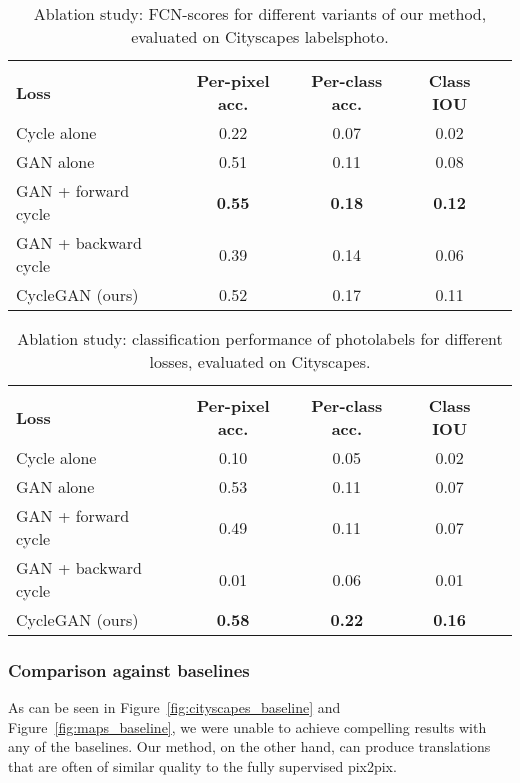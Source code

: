 \documentclass[10pt,twocolumn,letterpaper]{article}
\newcommand{\reffig}[1]{Figure~\ref{fig:#1}}
\newcommand{\lbltbl}[1]{\label{tbl:#1}}
\begin{document}
\begin{table}
\centering
\scalebox{0.75} {
\begin{tabular}{lcccc}
 & & & \\
\textbf{Loss} & \textbf{Per-pixel acc.} & \textbf{Per-class acc.} & \textbf{Class IOU} \\ \hline
Cycle alone & 0.22 & 0.07 & 0.02 \\
GAN alone & 0.51 & 0.11 & 0.08 \\
GAN + forward cycle & {\bf 0.55} & {\bf 0.18} & {\bf 0.12} \\ 
GAN + backward cycle & 0.39 & 0.14 & 0.06 \\ 
CycleGAN (ours) & 0.52 & 0.17 & 0.11 \\  
\end{tabular} }
\vspace{-0.1in}
\caption {Ablation study: FCN-scores for different variants of our method, evaluated on Cityscapes labelsphoto.}
\vspace{-0.2in}
\lbltbl{loss_fcn}
\end{table}



\begin{table}
\centering
\scalebox{0.75} {
\begin{tabular}{lcccc}
 & & & \\
\textbf{Loss} & \textbf{Per-pixel acc.} & \textbf{Per-class acc.} & \textbf{Class IOU} \\ \hline
Cycle alone & 0.10 & 0.05 & 0.02 \\
GAN alone & 0.53 & 0.11 & 0.07 \\
GAN + forward cycle & 0.49 & 0.11 & 0.07 \\ 
GAN + backward cycle & 0.01 & 0.06 & 0.01 \\ 
CycleGAN (ours)& {\bf 0.58} & {\bf 0.22} & {\bf 0.16} \\  
\end{tabular} }
\vspace{-0.1in}
\caption {Ablation study: classification performance of photolabels for different losses, evaluated on Cityscapes. }
\vspace{-0.2in}
\lbltbl{loss_clf}
\end{table}

\subsubsection{Comparison against baselines}
As can be seen in \reffig{cityscapes_baseline} and \reffig{maps_baseline}, we were unable to achieve compelling results with any of the baselines. Our method, on the other hand, can produce translations that are often of similar quality to the fully supervised pix2pix.
\end{document}
